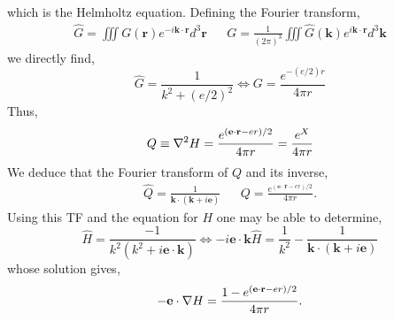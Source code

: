 which is the Helmholtz equation.
Defining the Fourier transform,
\begin{align}
    \hat{G} = \iiint G(\textbf{r}) e^{-i\textbf{k}\cdot \textbf{r}} d^3 \textbf{r}
    &&
    G = \frac{1}{(2\pi)^3}\iiint \hat{G}(\textbf{k}) e^{i\textbf{k}\cdot \textbf{r}} d^3 \textbf{k}
\end{align}
we directly find,
\begin{equation}
    \hat{G} = \frac{1}{k^2 + (e/2)^2}
    \Longleftrightarrow
    G = \frac{e^{-(e/2) r}}{4\pi r}
\end{equation}
Thus,
\begin{equation}
    Q \equiv \mathbf{\nabla}^2 H = \frac{e^{(\textbf{e}\cdot \textbf{r} -e r)/2}}{4\pi r}
    = \frac{e^{X}}{4\pi r}
\end{equation}
We deduce that the Fourier transform of $Q$ and its inverse,
\begin{align}
    \hat{Q} =\frac{1}{\textbf{k}\cdot (\textbf{k} +i\textbf{e})}
    && Q =\frac{e^{(\textbf{e}\cdot \textbf{r} -e r)/2}}{4\pi r}.
\end{align}
Using this TF and the equation for $H$ one may be able to determine,
\begin{equation}
     \hat{H} = \frac{-1}{k^2 (k^2 + i \textbf{e}\cdot \textbf{k})}\Longleftrightarrow
     - i \textbf{e}\cdot \textbf{k} \hat{H}=
     \frac{1}{k^2}  - \frac{1}{\textbf{k}\cdot (\textbf{k}+i\textbf{e})}
\end{equation}
whose solution gives,
\begin{equation}
    - \textbf{e}\cdot \mathbf{\nabla} H =  \frac{1- e^{(\textbf{e}\cdot \textbf{r} -e r)/2}}{4\pi r}.
\end{equation}

